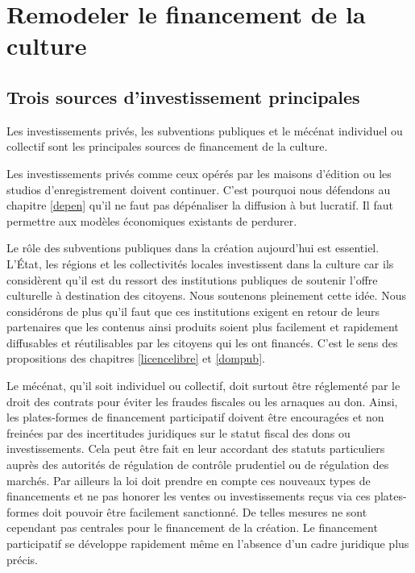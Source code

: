 \chapter{Remodeler le financement de la culture}\label{financement}

\section{Trois sources d'investissement principales}
Les investissements privés, les subventions publiques et le mécénat individuel ou collectif sont les principales sources de financement de la culture.

Les investissements privés comme ceux opérés par les maisons d'édition ou les studios d'enregistrement doivent continuer. C'est pourquoi nous défendons au chapitre \ref{depen} qu'il ne faut pas dépénaliser la diffusion à but lucratif. Il faut permettre aux modèles économiques existants de perdurer.

Le rôle des subventions publiques dans la création aujourd'hui est essentiel. L'État, les régions et les collectivités locales investissent dans la culture car ils considèrent qu'il est du ressort des institutions publiques de soutenir l'offre culturelle à destination des citoyens. Nous soutenons pleinement cette idée. Nous considérons de plus qu'il faut que ces institutions exigent en retour de leurs partenaires que les contenus ainsi produits soient plus facilement et rapidement diffusables et réutilisables par les citoyens qui les ont financés. C'est le sens des propositions des chapitres \ref{licencelibre} et \ref{dompub}. 

Le mécénat, qu'il soit individuel ou collectif, doit surtout être réglementé par le droit des contrats pour éviter les fraudes fiscales ou les arnaques au don. Ainsi, les plates-formes de financement participatif doivent être encouragées et non freinées par des incertitudes juridiques sur le statut fiscal des dons ou investissements. Cela peut être fait en leur accordant des statuts particuliers auprès des autorités de régulation de contrôle prudentiel ou de régulation des marchés. Par ailleurs la loi doit prendre en compte ces nouveaux types de financements et ne pas honorer les ventes ou investissements reçus via ces plates-formes doit pouvoir être facilement sanctionné. De telles mesures ne sont cependant pas centrales pour le financement de la création. Le financement participatif se développe rapidement même en l'absence d'un cadre juridique plus précis.

